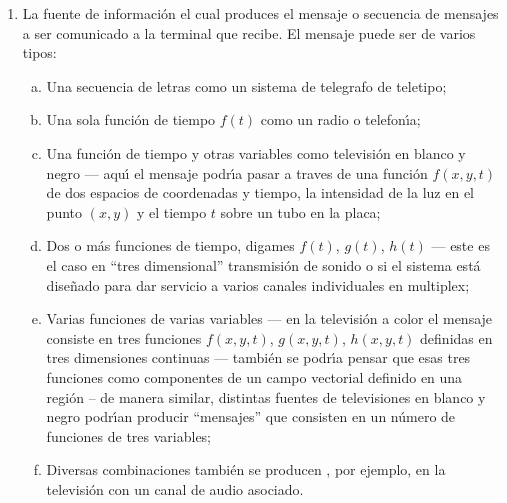 \begin{enumerate}
\item{La fuente de informaci\'{o}n el cual produces el mensaje o
  secuencia de mensajes a ser comunicado a la terminal que recibe. El
  mensaje puede ser de varios tipos:
  \begin{enumerate}[(a)]
  \item{Una secuencia de letras como un sistema de telegrafo de
    teletipo;}
  \item{Una sola funci\'{o}n de tiempo $f(t)$ como un radio o
    telefon\'{\i}a;}
  \item{Una funci\'{o}n de tiempo y otras variables como
    televisi\'{o}n en blanco y negro --- aqu\'{\i} el mensaje
    podr\'{\i}a pasar a traves de una funci\'{o}n $f(x,y,t)$ de dos
    espacios de coordenadas y tiempo, la intensidad de la luz en el
    punto $(x, y)$ y el tiempo $t$ sobre un tubo en la placa;}
  \item{Dos o m\'{a}s funciones de tiempo, digames $f(t)$, $g(t)$,
    $h(t)$ --- este es el caso en ``tres dimensional'' transmisi\'{o}n
    de sonido o si el sistema est\'{a} dise\~{n}ado para dar servicio
    a varios canales individuales en multiplex;}
  \item{Varias funciones de varias variables --- en la televisi\'{o}n
    a color el mensaje consiste en tres funciones $f(x,y,t)$,
    $g(x,y,t)$, $h(x,y,t)$ definidas en tres dimensiones continuas ---
    tambi\'{e}n se podr\'{\i}a pensar que esas tres funciones como
    componentes de un campo vectorial definido en una regi\'{o}n -- de
    manera similar, distintas fuentes de televisiones en blanco y
    negro podr\'{\i}an producir ``mensajes'' que consisten en un
    n\'{u}mero de funciones de tres variables;}
  \item{Diversas combinaciones tambi\'{e}n se producen , por ejemplo,
    en la televisi\'{o}n con un canal de audio asociado.}
\end{enumerate}}


\end{enumerate}
